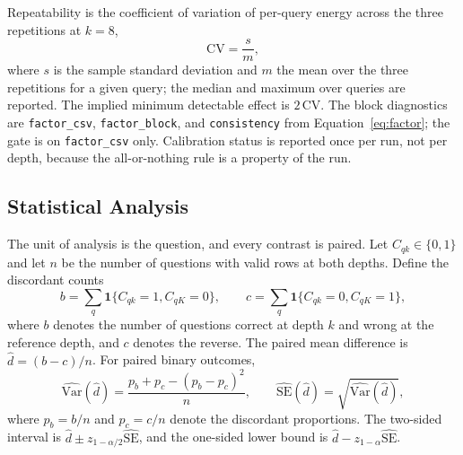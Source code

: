 \documentclass[a4paper,fleqn]{cas-sc}
\begin{document}
Repeatability is the coefficient of variation of per-query energy across the three repetitions at $k=8$,
\begin{equation}\label{eq:cv}
  \mathrm{CV}=\frac{s}{m},
\end{equation}
where $s$ is the sample standard deviation and $m$ the mean over the three repetitions for a given query; the median and maximum over queries are reported. The implied minimum detectable effect is $2\,\mathrm{CV}$. The block diagnostics are \texttt{factor\_csv}, \texttt{factor\_block}, and \texttt{consistency} from Equation~\eqref{eq:factor}; the gate is on \texttt{factor\_csv} only. Calibration status is reported once per run, not per depth, because the all-or-nothing rule is a property of the run.

\subsection{Statistical Analysis}\label{sec:stats}

The unit of analysis is the question, and every contrast is paired. Let $C_{qk}\in\{0,1\}$ and let $n$ be the number of questions with valid rows at both depths. Define the discordant counts
\begin{equation}\label{eq:discordant}
  b=\sum_{q}\mathbf{1}\{C_{qk}=1,C_{qK}=0\},
  \qquad
  c=\sum_{q}\mathbf{1}\{C_{qk}=0,C_{qK}=1\},
\end{equation}
where $b$ denotes the number of questions correct at depth $k$ and wrong at the reference depth, and $c$ denotes the reverse. The paired mean difference is $\hat d=(b-c)/n$. For paired binary outcomes,
\begin{equation}\label{eq:paired-se}
  \widehat{\mathrm{Var}}(\hat d)=\frac{p_{b}+p_{c}-(p_{b}-p_{c})^{2}}{n},
  \qquad
  \widehat{\mathrm{SE}}(\hat d)=\sqrt{\widehat{\mathrm{Var}}(\hat d)},
\end{equation}
where $p_{b}=b/n$ and $p_{c}=c/n$ denote the discordant proportions. The two-sided interval is $\hat d\pm z_{1-\alpha/2}\widehat{\mathrm{SE}}$, and the one-sided lower bound is $\hat d-z_{1-\alpha}\widehat{\mathrm{SE}}$.
\end{document}
